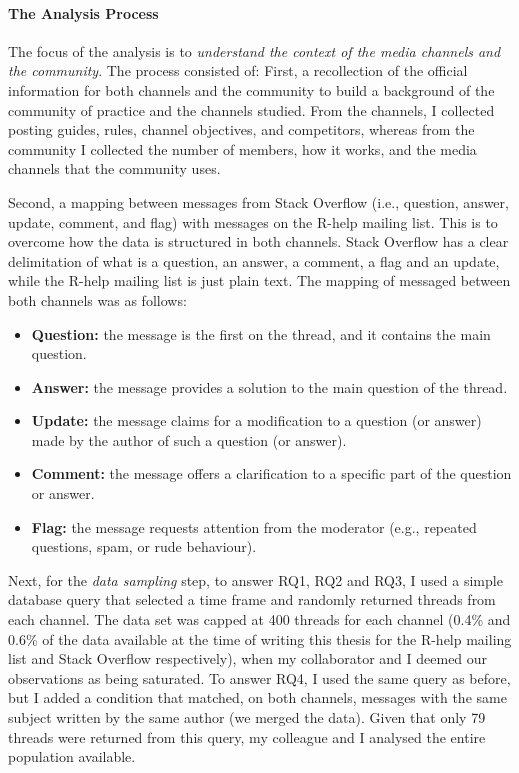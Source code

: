 \documentclass{sig-alternate-05-2015}
\begin{document}
\paragraph{The Analysis Process}

	The focus of the analysis is to \textit{understand the context of the media channels and the community}.
	The process consisted of:
	First, a recollection of the official information for both channels and the community to build a background of the community of practice and the channels studied.
    From the channels, I collected posting guides, rules, channel objectives, and competitors, whereas from the community I collected the number of members, how it works, and the media channels that the community uses.

	Second, a mapping between messages from Stack Overflow (i.e., question, answer, update, comment, and flag) with messages on the R-help mailing list.
    This is to overcome how the data is structured in both channels.
    Stack Overflow has a clear delimitation of what is a question, an answer, a comment, a flag and an update, while the R-help mailing list is just plain text.
    The mapping of messaged between both channels was as follows:

	\begin{itemize}
		\item \textbf{Question:} the message is the first on the thread, and it contains the main question.
		\item \textbf{Answer:} the message provides a solution to the main question of the thread.
	 	\item \textbf{Update:} the message claims for a modification to a question (or answer) made by the author of such a question (or answer).
		\item \textbf{Comment:} the message offers a clarification to a specific part of the question or answer.
		\item \textbf{Flag:} the message requests attention from the moderator (e.g., repeated questions, spam, or rude behaviour).
	\end{itemize}

	Next, for the \textit{data sampling} step, to answer RQ1, RQ2 and RQ3, I used a simple database query that selected a time frame and randomly returned threads from each channel.
	The data set was capped at 400 threads for each channel (0.4\% and 0.6\% of the data available at the time of writing this thesis for the R-help mailing list and Stack Overflow respectively), when my collaborator and I deemed our observations as being saturated.
	To answer RQ4, I used the same query as before, but I added a condition that matched, on both channels, messages with the same subject written by the same author (we merged the data).
	Given that only 79 threads were returned from this query, my colleague and I analysed the entire population available. 
\end{document}
